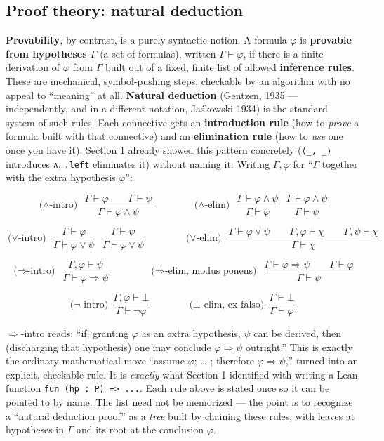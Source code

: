 \subsection{Proof theory: natural deduction}\label{sec:03-propositions-and-proofs:02-logic-recap:4}

\textbf{Provability}, by contrast, is a purely syntactic notion. A formula \(\varphi\) is \textbf{provable from hypotheses \(\Gamma\)} (a set of formulas), written \(\Gamma \vdash \varphi\), if there is a finite derivation of \(\varphi\) from \(\Gamma\) built out of a fixed, finite list of allowed \textbf{inference rules}. These are mechanical, symbol-pushing steps, checkable by an algorithm with no appeal to ``meaning'' at all. \textbf{Natural deduction} (Gentzen, 1935 --- independently, and in a different notation, Jaśkowski 1934) is the standard system of such rules. Each connective gets an \textbf{introduction rule} (how to \emph{prove} a formula built with that connective) and an \textbf{elimination rule} (how to \emph{use} one once you have it). Section 1 already showed this pattern concretely (\texttt{⟨\_\allowbreak{}, \_\allowbreak{}⟩} introduces \texttt{∧}, \texttt{.left} eliminates it) without naming it. Writing \(\Gamma, \varphi\) for ``\(\Gamma\) together with the extra hypothesis \(\varphi\)'':

\[
\text{($\wedge$-intro)}\ \ \frac{\Gamma \vdash \varphi \qquad \Gamma \vdash \psi}
{\Gamma \vdash \varphi \wedge \psi}
\qquad\qquad
\text{($\wedge$-elim)}\ \ \frac{\Gamma \vdash \varphi \wedge \psi}{\Gamma \vdash \varphi}
\ \ \ \frac{\Gamma \vdash \varphi \wedge \psi}{\Gamma \vdash \psi}
\]

\[
\text{($\vee$-intro)}\ \ \frac{\Gamma \vdash \varphi}{\Gamma \vdash \varphi \vee \psi}
\ \ \ \frac{\Gamma \vdash \psi}{\Gamma \vdash \varphi \vee \psi}
\qquad\qquad
\text{($\vee$-elim)}\ \ \frac{\Gamma \vdash \varphi \vee \psi \qquad \Gamma, \varphi \vdash \chi \qquad \Gamma, \psi \vdash \chi}{\Gamma \vdash \chi}
\]

\[
\text{($\Rightarrow$-intro)}\ \ \frac{\Gamma, \varphi \vdash \psi}{\Gamma \vdash \varphi \Rightarrow \psi}
\qquad\qquad
\text{($\Rightarrow$-elim, modus ponens)}\ \ \frac{\Gamma \vdash \varphi \Rightarrow \psi \qquad \Gamma \vdash \varphi}{\Gamma \vdash \psi}
\]

\[
\text{($\neg$-intro)}\ \ \frac{\Gamma, \varphi \vdash \bot}{\Gamma \vdash \neg\varphi}
\qquad\qquad
\text{($\bot$-elim, ex falso)}\ \ \frac{\Gamma \vdash \bot}{\Gamma \vdash \varphi}
\]

\(\Rightarrow\)-intro reads: ``if, granting \(\varphi\) as an extra hypothesis, \(\psi\) can be derived, then (discharging that hypothesis) one may conclude \(\varphi \Rightarrow \psi\) outright.'' This is exactly the ordinary mathematical move ``assume \(\varphi\); \ldots{} ; therefore \(\varphi
\Rightarrow \psi\),'' turned into an explicit, checkable rule. It is \emph{exactly} what Section 1 identified with writing a Lean function \texttt{fun (hp : P) => ...}. Each rule above is stated once so it can be pointed to by name. The list need not be memorized --- the point is to recognize a ``natural deduction proof'' as a \emph{tree} built by chaining these rules, with leaves at hypotheses in \(\Gamma\) and its root at the conclusion \(\varphi\).

